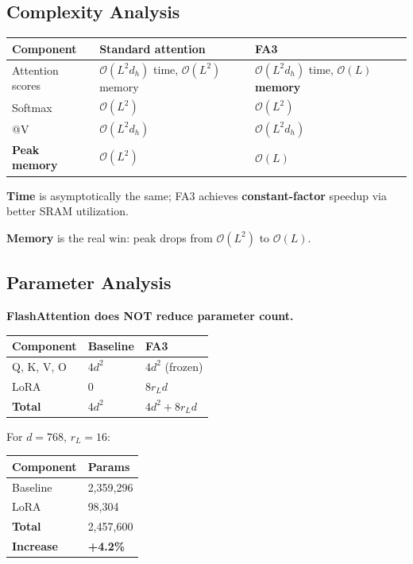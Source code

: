 \subsection{Complexity Analysis}

\begin{table}[H]
\centering
\small
\begin{tabular}{lll}
\toprule
\textbf{Component} & \textbf{Standard attention} & \textbf{FA3} \\
\midrule
Attention scores & $\mathcal{O}(L^2 d_h)$ time, $\mathcal{O}(L^2)$ memory & $\mathcal{O}(L^2 d_h)$ time, \textbf{$\mathcal{O}(L)$ memory} \\
Softmax & $\mathcal{O}(L^2)$ & $\mathcal{O}(L^2)$ \\
@V & $\mathcal{O}(L^2 d_h)$ & $\mathcal{O}(L^2 d_h)$ \\
\textbf{Peak memory} & $\mathcal{O}(L^2)$ & \textbf{$\mathcal{O}(L)$} \\
\bottomrule
\end{tabular}
\end{table}

\textbf{Time} is asymptotically the same; FA3 achieves \textbf{constant-factor} 
speedup via better SRAM utilization.

\textbf{Memory} is the real win: peak drops from $\mathcal{O}(L^2)$ to 
$\mathcal{O}(L)$.

\subsection{Parameter Analysis}

\textbf{FlashAttention does NOT reduce parameter count.}

\begin{table}[H]
\centering
\small
\begin{tabular}{lll}
\toprule
\textbf{Component} & \textbf{Baseline} & \textbf{FA3} \\
\midrule
Q, K, V, O & $4 d^2$ & $4 d^2$ (frozen) \\
LoRA & 0 & $8 r_L d$ \\
\textbf{Total} & $4 d^2$ & $4 d^2 + 8 r_L d$ \\
\bottomrule
\end{tabular}
\end{table}

For $d = 768$, $r_L = 16$:

\begin{table}[H]
\centering
\small
\begin{tabular}{ll}
\toprule
\textbf{Component} & \textbf{Params} \\
\midrule
Baseline & 2,359,296 \\
LoRA & 98,304 \\
\textbf{Total} & 2,457,600 \\
\textbf{Increase} & \textbf{+4.2\%} \\
\bottomrule
\end{tabular}
\end{table}

